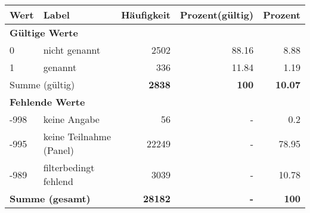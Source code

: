      \begin{longtable}{lXrrr}
     \toprule
     \textbf{Wert} & \textbf{Label} & \textbf{Häufigkeit} & \textbf{Prozent(gültig)} & \textbf{Prozent} \\
     \endhead
     \midrule
     \multicolumn{5}{l}{\textbf{Gültige Werte}}\\

     0 &
     \multicolumn{1}{X}{ nicht genannt   } &


       \num{2502} &
       \num[round-mode=places,round-precision=2]{88,16} &
         \num[round-mode=places,round-precision=2]{8,88} \\

     1 &
     \multicolumn{1}{X}{ genannt   } &


       \num{336} &
       \num[round-mode=places,round-precision=2]{11,84} &
         \num[round-mode=places,round-precision=2]{1,19} \\
     \midrule
     \multicolumn{2}{l}{Summe (gültig)} &
       \textbf{\num{2838}} &
     \textbf{100} &
       \textbf{\num[round-mode=places,round-precision=2]{10,07}} \\
     \multicolumn{5}{l}{\textbf{Fehlende Werte}}\\
       -998 &
       keine Angabe &
         \num{56} &
        - &
         \num[round-mode=places,round-precision=2]{0,2} \\
       -995 &
       keine Teilnahme (Panel) &
         \num{22249} &
        - &
         \num[round-mode=places,round-precision=2]{78,95} \\
       -989 &
       filterbedingt fehlend &
         \num{3039} &
        - &
         \num[round-mode=places,round-precision=2]{10,78} \\
     \midrule
     \multicolumn{2}{l}{\textbf{Summe (gesamt)}} &
          \textbf{\num{28182}} &
        \textbf{-} &
        \textbf{100} \\
     \bottomrule
     \end{longtable}
     
